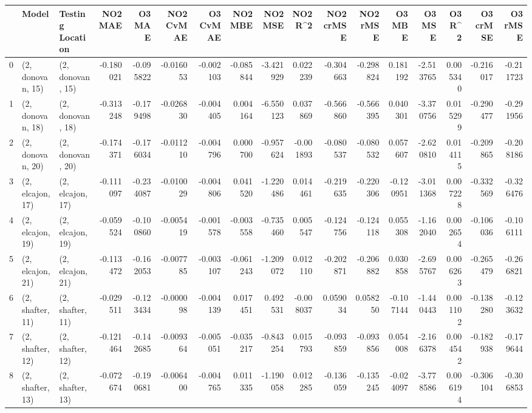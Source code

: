 \begin{tabular}{lllrrrrrrrrrrrrrr}
\toprule
{} &             Model &  Testing Location &   NO2 MAE &    O3 MAE &  NO2 CvMAE &  O3 CvMAE &   NO2 MBE &    NO2 MSE &   NO2 R\textasciicircum2 &  NO2 crMSE &  NO2 rMSE &    O3 MBE &     O3 MSE &    O3 R\textasciicircum2 &  O3 crMSE &   O3 rMSE \\
\midrule
0  &  (2, donovan, 15) &  (2, donovan, 15) & -0.180021 & -0.095822 &  -0.016053 & -0.002103 & -0.085844 &  -3.421929 &  0.022239 &  -0.304663 & -0.298824 &  0.181192 &  -2.513765 &  0.005340 & -0.216017 & -0.211723 \\
1  &  (2, donovan, 18) &  (2, donovan, 18) & -0.313248 & -0.179498 &  -0.026830 & -0.004405 &  0.004164 &  -6.550123 &  0.037869 &  -0.566860 & -0.566395 &  0.040301 &  -3.370756 &  0.015299 & -0.290477 & -0.291956 \\
2  &  (2, donovan, 20) &  (2, donovan, 20) & -0.174371 & -0.176034 &  -0.011210 & -0.004796 &  0.000700 &  -0.957624 & -0.001893 &  -0.080537 & -0.080532 &  0.057607 &  -2.620810 &  0.014115 & -0.209865 & -0.208186 \\
3  &  (2, elcajon, 17) &  (2, elcajon, 17) & -0.111097 & -0.234087 &  -0.010029 & -0.004806 &  0.041520 &  -1.220486 &  0.014461 &  -0.219635 & -0.220306 & -0.120951 &  -3.011368 &  0.007228 & -0.332569 & -0.326476 \\
4  &  (2, elcajon, 19) &  (2, elcajon, 19) & -0.059524 & -0.100860 &  -0.005419 & -0.001578 & -0.003558 &  -0.735460 &  0.005547 &  -0.124756 & -0.124118 &  0.055308 &  -1.162040 &  0.002654 & -0.106036 & -0.106111 \\
5  &  (2, elcajon, 21) &  (2, elcajon, 21) & -0.113472 & -0.162053 &  -0.007785 & -0.003107 & -0.061243 &  -1.209072 &  0.012110 &  -0.202871 & -0.206882 &  0.030858 &  -2.695767 &  0.006263 & -0.265479 & -0.266821 \\
6  &  (2, shafter, 11) &  (2, shafter, 11) & -0.029511 & -0.123434 &  -0.000098 & -0.004139 &  0.017451 &   0.492531 & -0.008037 &   0.059034 &  0.058250 & -0.107144 &  -1.440443 &  0.001102 & -0.138280 & -0.123632 \\
7  &  (2, shafter, 12) &  (2, shafter, 12) & -0.121464 & -0.142685 &  -0.009364 & -0.005051 & -0.035217 &  -0.843254 &  0.015793 &  -0.093859 & -0.093856 &  0.054008 &  -2.166378 &  0.004542 & -0.182938 & -0.179644 \\
8  &  (2, shafter, 13) &  (2, shafter, 13) & -0.072674 & -0.190681 &  -0.006400 & -0.004765 &  0.011335 &  -1.190058 &  0.012285 &  -0.136059 & -0.135245 & -0.024097 &  -3.778586 &  0.006194 & -0.306104 & -0.306853 \\

\end{tabular}
